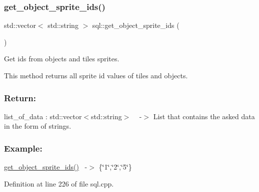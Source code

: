 \subsubsection{\texorpdfstring{get\+\_\+object\+\_\+sprite\+\_\+ids()}{get\_object\_sprite\_ids()}}
{\footnotesize\ttfamily std\+::vector$<$ std\+::string $>$ sql\+::get\+\_\+object\+\_\+sprite\+\_\+ids (\begin{DoxyParamCaption}{ }\end{DoxyParamCaption})}



Get id\textquotesingle{}s from objects and tiles sprites. 

This method returns all sprite id values of tiles and objects.~\newline


\subsubsection*{Return\+: }

list\+\_\+of\+\_\+data \+: std\+::vector$<$std\+::string$>$ ~\newline
-\/$>$ List that contains the asked data in the form of strings.

\subsubsection*{Example\+: }

\hyperlink{classsql_a0ea1aa772cb693be29da61c6cadffd86}{get\+\_\+object\+\_\+sprite\+\_\+ids()}~\newline
-\/$>$ \{\char`\"{}1\char`\"{},\char`\"{}2\char`\"{},\char`\"{}5\char`\"{}\} 

Definition at line 226 of file sql.\+cpp.

